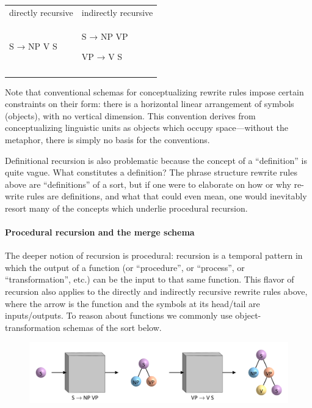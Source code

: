\begin{tabularx}{\textwidth}{XX}
\lsptoprule
directly recursive & indirectly recursive\\
S → NP V S & S → NP VP

VP →  V S\\
\lspbottomrule
\end{tabularx}
  Note that conventional schemas for conceptualizing rewrite rules impose certain constraints on their form: there is a horizontal linear arrangement of symbols (objects), with no vertical dimension. This convention derives from conceptualizing linguistic units as objects which occupy space—without the metaphor, there is simply no basis for the conventions.

  Definitional recursion is also problematic because the concept of a “definition” is quite vague. What constitutes a definition? The phrase structure rewrite rules above are “definitions” of a sort, but if one were to elaborate on how or why re-write rules are definitions, and what that could even mean, one would inevitably resort many of the concepts which underlie procedural recursion.

\paragraph{Procedural recursion and the merge schema}

The deeper notion of recursion is procedural: recursion is a temporal pattern in which the output of a function (or “procedure”, or “process”, or “transformation”, etc.) can be the input to that same function. This flavor of recursion also applies to the directly and indirectly recursive rewrite rules above, where the arrow is the function and the symbols at its head/tail are inputs/outputs. To reason about functions we commonly use object-transformation schemas of the sort below.

  
\begin{figure}
\includegraphics[width=\textwidth]{figures/Tilsen-img107.png}
\caption{\missingcaption}
\label{fig:}
\end{figure}
 

